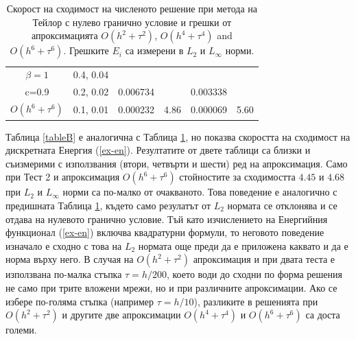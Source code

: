 \documentclass{article}
\newcommand{\rf}[1]{(\ref{#1})}
\begin{document}
\begin{table}[ht]
\begin{tabular}{||c|l|ll|ll||}
    \hline
  $\beta=1$     &0.4, 0.04   &            &          &                  &      \\
      c=0.9                    &0.2, 0.02   &0.006734 &           & 0.003338      &       \\
     $O(h^6+ \tau^6)$ &0.1, 0.01 & 0.000232 &4.86 & 0.000069  & 5.60        \\
	   \hline
			\hline 
		\end{tabular}
		\caption{Скорост на сходимост на численото решение при метода на Тейлор с нулево гранично условие и грешки от апроксимацията $O(h^{2} + \tau^2 )$, $O(h^{4} + \tau^4 )$ and $O(h^{6} + \tau^6 )$. Грешките $E_i$ са измерени в $L_2$ и $L_\infty$ норми.}
\label{tableA}
\end{table}

Таблица \ref{tableB} е аналогична с Таблица \ref{tableA}, но показва скоростта на сходимост на дискретната Енергия \rf{ex-en}. Резултатите от двете таблици са близки и съизмерими с използвания (втори, четвърти и шести) ред на апроксимация. Само при  Тест 2 и апроксимация $O(h^6 + \tau^6)$ стойностите за сходимостта $4.45$ и $4.68$ при $L_2$ и $L_{\infty}$ норми са по-малко от очакваното. Това поведение е аналогично с предишната Таблица \ref{tableA}, където само резулатът от $L_2$ нормата се отклонява и се отдава на нулевото гранично условие. Тъй като изчислението на Енергийния функционал \rf{ex-en} включва квадратурни формули, то неговото поведение изначало е сходно с това на $L_2$ нормата още преди да е приложена каквато и да е норма върху него. В случая на $O(h^2 + \tau^2)$  апроксимация и при двата теста е използвана по-малка стъпка $\tau = h/200$, което води до сходни по форма решения не само при трите вложени мрежи, но и при различните апроксимации. Ако се избере по-голяма стъпка (например $\tau = h/10$), разликите в решенията при $O(h^2 + \tau^2)$ и другите две апроксимации $O(h^4 + \tau^4)$ и $O(h^6 + \tau^6)$ са доста големи.

\end{document}

